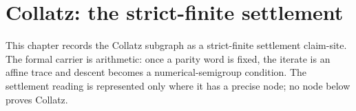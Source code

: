 \chapter{Collatz: the strict-finite settlement}\label{ch:collatz}

This chapter records the Collatz subgraph as a strict-finite settlement claim-site.
The formal carrier is arithmetic: once a parity word is fixed, the iterate is an
affine trace and descent becomes a numerical-semigroup condition.  The settlement
reading is represented only where it has a precise node; no node below proves
Collatz.









